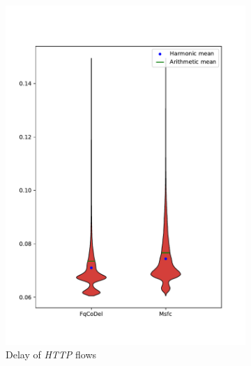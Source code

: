 \begin{figure}
	\begin{subfigure}[b]{0.475\textwidth}   
		\centering 
		\includegraphics[width=\textwidth]{drawings/type4-delay-down_A}
		\caption[]%
		{{\small Delay of \emph{HTTP} flows}}    
		\label{fig:delay_http}
	\end{subfigure}
	\quad
	\begin{subfigure}[b]{0.475\textwidth}   
		\centering 

\end{subfigure}
\end{figure}

